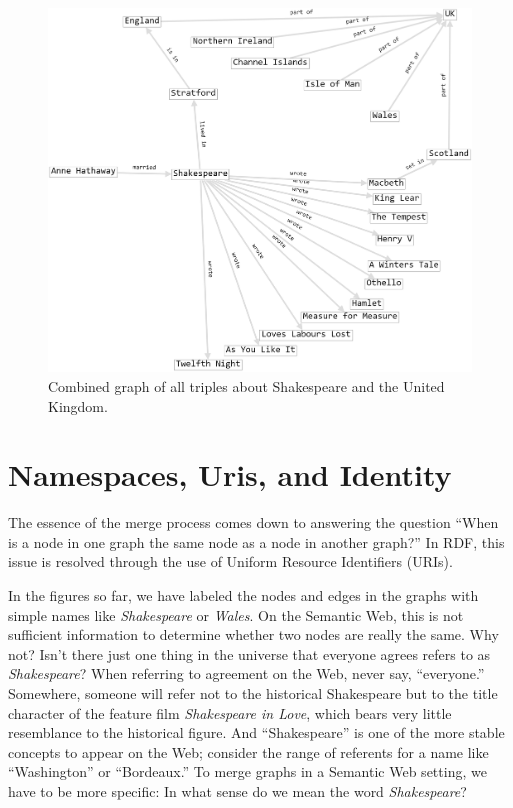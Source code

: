 \begin{figure}
    \centering
    \includegraphics[width=5.0in]{SWWOv3/media/ch3/figure3-6.png}
    \caption{Combined graph of all triples about Shakespeare and the United Kingdom.}
    \label{fig:ch3.6}
\end{figure}



\section{Namespaces, Uris, and Identity}

The essence of the merge process comes down to answering the question ``When is
a node in one graph the same node as a node in another graph?'' In RDF,
this issue is resolved through the use of Uniform Resource Identifiers
(URIs).

In the figures so far, we have labeled the nodes and edges in the graphs
with simple names like \emph{Shakespeare} or \emph{Wales}. On the Semantic Web, this
is not sufficient information to determine whether two nodes are really
the same. Why not? Isn't there just one thing in the universe that
everyone agrees refers to as \emph{Shakespeare}? When referring to agreement on
the Web, never say, ``everyone.'' Somewhere, someone will refer not to
the historical Shakespeare but to the title character of the feature
film \emph{Shakespeare in Love}, which bears very little resemblance to
the historical figure. And ``Shakespeare'' is one of the more stable
concepts to appear on the Web; consider the range of referents for a
name like ``Washington'' or ``Bordeaux.'' To merge graphs in a Semantic
Web setting, we have to be more specific: In what sense do we mean the
word \emph{Shakespeare}?


